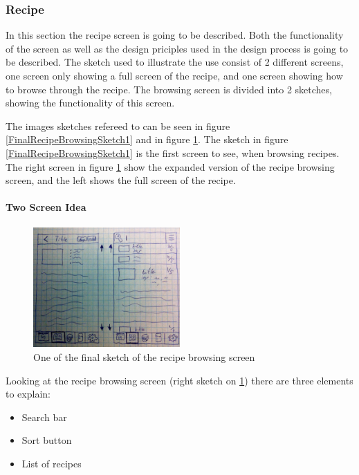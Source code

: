 \subsubsection{Recipe} \label{RecipesSketches}
In this section the recipe screen is going to be described. Both the functionality of the screen as well as the design priciples used in the design process is going to be described. The sketch used to illustrate the use consist of 2 different screens, one screen only showing a full screen of the recipe, and one screen showing how to browse through the recipe. The browsing screen is divided into 2 sketches, showing the functionality of this screen.

The images sketches refereed to can be seen in figure \ref{FinalRecipeBrowsingSketch1} and in figure \ref{FinalRecipeBrowsingSketch2}. The sketch in figure \ref{FinalRecipeBrowsingSketch1} is the first screen to see, when browsing recipes. The right screen in figure \ref{FinalRecipeBrowsingSketch2} show the expanded version of the recipe browsing screen, and the left shows the full screen of the recipe.

\paragraph{Two Screen Idea}

\begin{figure}[H]
    \centering
    \includegraphics[width=0.5\textwidth]{Grafik/FoodPlanner/FinalRecipeBrowsingSketch2}
    \caption{One of the final sketch of the recipe browsing screen}
    \label{FinalRecipeBrowsingSketch2}
\end{figure}

Looking at the recipe browsing screen (right sketch on \cref{FinalRecipeBrowsingSketch2}) there are three elements to explain: 

\begin{itemize}
    \item Search bar
    \item Sort button
    \item List of recipes
\end{itemize}

